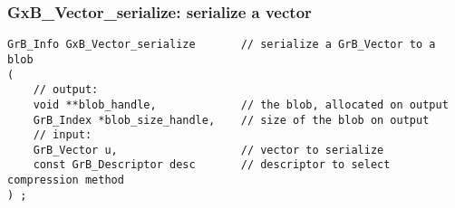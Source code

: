 \documentclass[12pt]{article}
\begin{document}

%

\subsubsection{{\sf GxB\_Vector\_serialize:}      serialize a vector}
\label{vector_serialize_GxB}

\begin{mdframed}[userdefinedwidth=6in]
{\footnotesize
\begin{verbatim}
GrB_Info GxB_Vector_serialize       // serialize a GrB_Vector to a blob
(
    // output:
    void **blob_handle,             // the blob, allocated on output
    GrB_Index *blob_size_handle,    // size of the blob on output
    // input:
    GrB_Vector u,                   // vector to serialize
    const GrB_Descriptor desc       // descriptor to select compression method
) ;
\end{verbatim}
} \end{mdframed}
\end{document}
